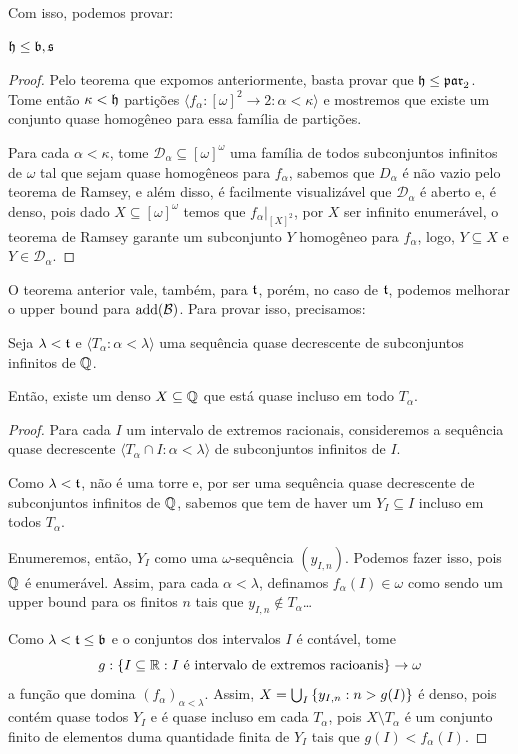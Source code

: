 Com isso, podemos provar:

\begin{theorem}
    $\mathfrak{h} \leq \mathfrak{b}, \mathfrak{s}$
\end{theorem}
\begin{proof}
    Pelo teorema que expomos anteriormente, basta provar que $\mathfrak{h} \leq \mathfrak{par}_2$. Tome então $\kappa < \mathfrak{h}$ partições $\langle f_\alpha: [\omega]^2 \to 2 : \alpha < \kappa \rangle$ e mostremos que existe um conjunto quase homogêneo para essa família de partições. 

    Para cada $\alpha < \kappa$, tome $\mathcal D_\alpha \subseteq [\omega]^\omega$ uma família de todos subconjuntos infinitos de $\omega$ tal que sejam quase homogêneos para $f_\alpha$, sabemos que $D_\alpha$ é não vazio pelo teorema de Ramsey, e além disso, é facilmente visualizável que $\mathcal D_\alpha$ é aberto e, é denso, pois dado $X \subseteq [\omega]^\omega$ temos que $f_\alpha|_{[X]^2}$, por $X$ ser infinito enumerável, o teorema de Ramsey garante um subconjunto $Y$ homogêneo para $f_\alpha$, logo, $Y \subseteq X$ e $Y\in \mathcal D_\alpha$. 
\end{proof}

O teorema anterior vale, também, para $\mathfrak{t}$, porém, no caso de $\mathfrak{t}$, podemos melhorar o upper bound para $\operatorname{add}(\mathcal B)$. Para provar isso, precisamos:

\begin{lemma}
    Seja $\lambda < \mathfrak{t}$ e $\langle T_\alpha : \alpha < \lambda \rangle$ uma sequência quase decrescente de subconjuntos infinitos de $\mathbb{Q}$. 

    Então, existe um denso $X \subseteq \mathbb{Q}$ que está quase incluso em todo $T_\alpha$.
\end{lemma}
\begin{proof}
    Para cada $I$ um intervalo de extremos racionais, consideremos a sequência quase decrescente $\langle T_\alpha\cap I : \alpha < \lambda \rangle$ de subconjuntos infinitos de $I$. 

    Como $\lambda < \mathfrak{t}$, não é uma torre e, por ser uma sequência quase decrescente de subconjuntos infinitos de $\mathbb{Q}$, sabemos que tem de haver um $Y_I \subseteq I$ incluso em todos $T_\alpha$. \pending

    Enumeremos, então, $Y_I$ como uma $\omega$-sequência $(y_{I,n})$. Podemos fazer isso, pois $\mathbb{Q}$ é enumerável. Assim, para cada $\alpha < \lambda$, definamos $f_\alpha(I) \in \omega$ como sendo um upper bound para os finitos $n$ tais que $y_{I,n}\notin T_\alpha$\dots
    
    Como $\lambda < \mathfrak{t}\leq \mathfrak{b}$ e o conjuntos dos intervalos $I$ é contável, tome 
    $$g:\left\{ I \subseteq \mathbb{R} : I \text{ é intervalo de extremos racioanis} \right\} \to \omega$$
    a função que domina $(f_\alpha)_{\alpha < \lambda}$. Assim, $X = \bigcup_{I} \left\{ y_{I,n}: n > g(I) \right\}$ é denso, pois contém quase todos $Y_I$ e é quase incluso em cada $T_\alpha$, pois $X\setminus T_\alpha$ é um conjunto finito de elementos duma quantidade finita de $Y_I$ tais que $g(I) < f_\alpha(I)$. 
\end{proof}

